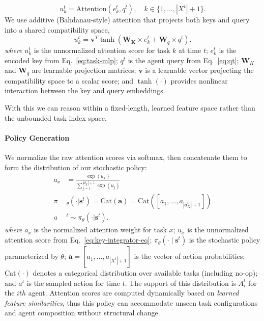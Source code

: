 
\begin{equation}\label{eq:attention}
u^t_k = \mathrm{Attention}(e_k^t, q^t), \quad k \in \{1, \ldots, |X^t|+1\}.
\end{equation}
We use additive (Bahdanau-style) attention \cite{bahdanau2014neural} that projects both keys and query into a shared compatibility space,
\begin{equation}
u_k^t = \mathbf{v}^T \tanh(\mathbf{W}_\mathbf{K} \times e_k^t + \mathbf{W}_q \times  q^t).
\end{equation}
\noindent\textit{where} \(u_k^t\) is the unnormalized attention score for task \(k\) at time \(t\);
\(e_k^t\) is the encoded key from Eq.~\eqref{eq:task-mlp};
\(q^t\) is the agent query from Eq.~\eqref{eq:qt};
\(\mathbf{W}_K\) and \(\mathbf{W}_q\) are learnable projection matrices;
\(\mathbf{v}\) is a learnable vector projecting the compatibility space to a scalar score;
and \(\tanh(\cdot)\) provides nonlinear interaction between the key and query embeddings.


With this we can reason within a fixed-length, learned feature space rather than the unbounded task index space.

\paragraph{\textbf{Policy Generation}}
We normalize the raw attention scores via softmax, then concatenate them to form the distribution of our stochastic policy:
\begin{equation}
\begin{split}
    a_x& = \frac{\exp(u_x)}{\sum_{j=1}^{|\mathbf{o}^t_{X}|+1} \exp(u_j)}
    \\
    \pi&_\theta(\cdot | \mathbf{s}^t) = \mathrm{Cat}(\mathbf{a}) = \mathrm{Cat}([a_1, \ldots, a_{|\mathbf{o}^t_{X}|+1}])\\
    a&^t \sim \pi_\theta(\cdot | \mathbf{s}^t).
\end{split}
\end{equation}
\noindent\textit{where} \(a_x\) is the normalized attention weight for task \(x\);
\(u_x\) is the unnormalized attention score from Eq.~\eqref{eq:key-integrator-eq}; 
\(\pi_\theta(\cdot \mid \mathbf{s}^t)\) is the stochastic policy parameterized by \(\theta\);
\(\mathbf{a} = [a_1, \ldots, a_{|X^t|+1}]\) is the vector of action probabilities;
\(\mathrm{Cat}(\cdot)\) denotes a categorical distribution over available tasks (including no-op);
and \(a^t\) is the sampled action for time \(t\).
The support of this distribution is $A^t_i$ for the $ith$ agent. Attention scores are computed dynamically based on \emph{learned feature similarities}, thus this policy can accommodate unseen task configurations and agent composition without structural change.
\fi

